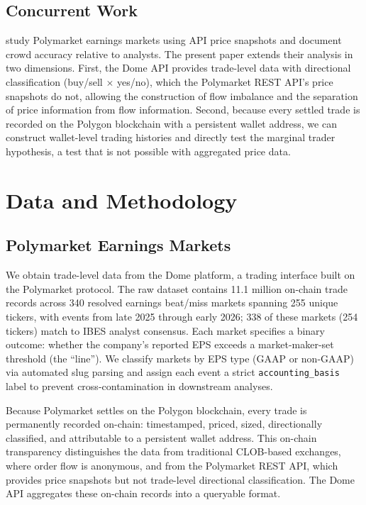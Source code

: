 \documentclass[11pt]{article}
\begin{document}
\subsection{Concurrent Work}

\citet{gomezcram2025financial} study Polymarket earnings markets using API price snapshots and document crowd accuracy relative to analysts. The present paper extends their analysis in two dimensions. First, the Dome API provides trade-level data with directional classification (buy/sell $\times$ yes/no), which the Polymarket REST API's price snapshots do not, allowing the construction of flow imbalance and the separation of price information from flow information. Second, because every settled trade is recorded on the Polygon blockchain with a persistent wallet address, we can construct wallet-level trading histories and directly test the marginal trader hypothesis, a test that is not possible with aggregated price data.

\section{Data and Methodology} \label{sec:data}

\subsection{Polymarket Earnings Markets}

We obtain trade-level data from the Dome platform, a trading interface built on the Polymarket protocol. The raw dataset contains 11.1 million on-chain trade records across 340 resolved earnings beat/miss markets spanning 255 unique tickers, with events from late 2025 through early 2026; 338 of these markets (254 tickers) match to IBES analyst consensus. Each market specifies a binary outcome: whether the company's reported EPS exceeds a market-maker-set threshold (the ``line''). We classify markets by EPS type (GAAP or non-GAAP) via automated slug parsing and assign each event a strict \texttt{accounting\_basis} label to prevent cross-contamination in downstream analyses.

Because Polymarket settles on the Polygon blockchain, every trade is permanently recorded on-chain: timestamped, priced, sized, directionally classified, and attributable to a persistent wallet address. This on-chain transparency distinguishes the data from traditional CLOB-based exchanges, where order flow is anonymous, and from the Polymarket REST API, which provides price snapshots but not trade-level directional classification. The Dome API aggregates these on-chain records into a queryable format.
\end{document}
